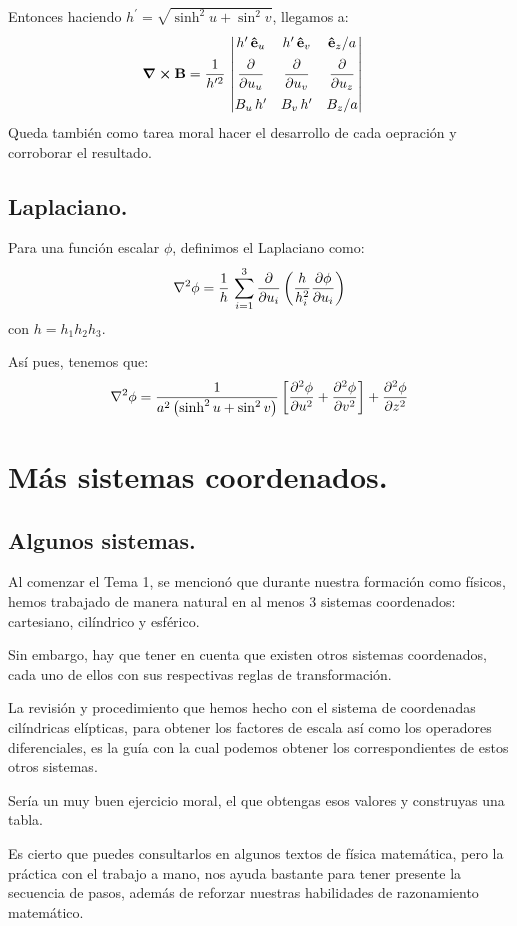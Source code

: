 \documentclass[12pt]{article}
\numberwithin{equation}{section}
\begin{document}
Entonces haciendo $h^{\prime} = \sqrt{\sinh^{2} u + \sin^{2} v}$, llegamos a:
\begin{align*}
\curl{\vb{B}} &= \dfrac{1}{h^{\prime 2}} \, \mdet{
h^{\prime} \, \vu{e}_{u} & h^{\prime} \, \vu{e}_{v} & \vu{e}_{z} / a \\[0.5em]
\displaystyle \pdv{u_{u}} & \displaystyle \pdv{u_{v}} & \displaystyle \pdv{u_{z}} \\[1em]
B_{u} \, h^{\prime} & B_{v} \, h^{\prime} & B_{z} / a
}
\end{align*}
Queda también como tarea moral hacer el desarrollo de cada oepración y corroborar el resultado.

\subsection{Laplaciano.}

Para una función escalar $\phi$, definimos el Laplaciano como:
\begin{align*}
\laplacian{\phi} = \dfrac{1}{h} \, \sum_{i=1}^{3} \pdv{u_{i}} \left( \dfrac{h}{h_{i}^{2}}  \pdv{\phi}{u_{i}} \right)
\end{align*}
con $h = h_{1} h_{2} h_{3}$.
\par
Así pues, tenemos que:
\begin{align*}
\laplacian{\phi} = \dfrac{1}{a^{2} \left( \sinh^{2} u + \sin^{2} v \right)} \left[ \pdv[2]{\phi}{u} + \pdv[2]{\phi}{v} \right] + \pdv[2]{\phi}{z}
\end{align*}


\section{Más sistemas coordenados.}

\subsection{Algunos sistemas.}

Al comenzar el Tema 1, se mencionó que durante nuestra formación como físicos, hemos trabajado de manera natural en al menos $3$ sistemas coordenados: cartesiano, cilíndrico y esférico.
\par
Sin embargo, hay que tener en cuenta que existen otros sistemas coordenados, cada uno de ellos con sus respectivas reglas de transformación.
\par
La revisión y procedimiento que hemos hecho con el sistema de coordenadas cilíndricas elípticas, para obtener los factores de escala así como los operadores diferenciales, es la guía con la cual podemos obtener los correspondientes de estos otros sistemas.
\par
Sería un muy buen ejercicio moral, el que obtengas esos valores y construyas una tabla.
\par
Es cierto que puedes consultarlos en algunos textos de física matemática, pero la práctica con el trabajo a mano, nos ayuda bastante para tener presente la secuencia de pasos, además de reforzar nuestras habilidades de razonamiento matemático.
\end{document}
